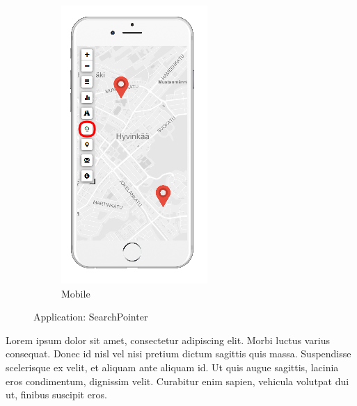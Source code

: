 \begin{figure}[ht]
\begin{subfigure}[b]{0.2\textwidth}
        \includegraphics[width=\textwidth]
          {img/c02-application/png/mobile-basemap-search.png}
        \caption{Mobile}
    \end{subfigure}
    \caption{Application: SearchPointer}
\end{figure}

Lorem ipsum dolor sit amet, consectetur adipiscing elit. Morbi luctus varius consequat. Donec id nisl vel nisi pretium dictum sagittis quis massa. Suspendisse scelerisque ex velit, et aliquam ante aliquam id. Ut quis augue sagittis, lacinia eros condimentum, dignissim velit. Curabitur enim sapien, vehicula volutpat dui ut, finibus suscipit eros. 

